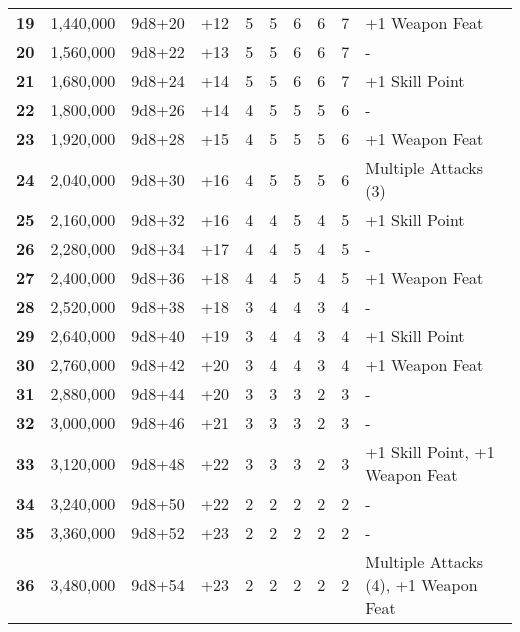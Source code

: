 \begin {table}[H]
\begin{tabularx}{\columnwidth}{>{\bfseries}cccM{.31in}M{.51in}M{.25in}M{.43in}M{.32in}M{.45in}Y}
		19 & 1,440,000 & 9d8+20 & +12 & 5 & 5 & 6 & 6 & 7 & +1 Weapon Feat\\
		20 & 1,560,000 & 9d8+22 & +13 & 5 & 5 & 6 & 6 & 7 & -\\
		21 & 1,680,000 & 9d8+24 & +14 & 5 & 5 & 6 & 6 & 7 & +1 Skill Point\\
		22 & 1,800,000 & 9d8+26 & +14 & 4 & 5 & 5 & 5 & 6 & -\\
		23 & 1,920,000 & 9d8+28 & +15 & 4 & 5 & 5 & 5 & 6 & +1 Weapon Feat\\
		24 & 2,040,000 & 9d8+30 & +16 & 4 & 5 & 5 & 5 & 6 & Multiple Attacks (3)\\
		25 & 2,160,000 & 9d8+32 & +16 & 4 & 4 & 5 & 4 & 5 & +1 Skill Point\\
		26 & 2,280,000 & 9d8+34 & +17 & 4 & 4 & 5 & 4 & 5 & -\\
		27 & 2,400,000 & 9d8+36 & +18 & 4 & 4 & 5 & 4 & 5 & +1 Weapon Feat\\
		28 & 2,520,000 & 9d8+38 & +18 & 3 & 4 & 4 & 3 & 4 & -\\
		29 & 2,640,000 & 9d8+40 & +19 & 3 & 4 & 4 & 3 & 4 & +1 Skill Point\\
		30 & 2,760,000 & 9d8+42 & +20 & 3 & 4 & 4 & 3 & 4 & +1 Weapon Feat\\
		31 & 2,880,000 & 9d8+44 & +20 & 3 & 3 & 3 & 2 & 3 & -\\
		32 & 3,000,000 & 9d8+46 & +21 & 3 & 3 & 3 & 2 & 3 & -\\
		33 & 3,120,000 & 9d8+48 & +22 & 3 & 3 & 3 & 2 & 3 & +1 Skill Point, +1 Weapon Feat\\
		34 & 3,240,000 & 9d8+50 & +22 & 2 & 2 & 2 & 2 & 2 & -\\
		35 & 3,360,000 & 9d8+52 & +23 & 2 & 2 & 2 & 2 & 2 & -\\
		36 & 3,480,000 & 9d8+54 & +23 & 2 & 2 & 2 & 2 & 2 & Multiple Attacks (4), +1 Weapon Feat\
  \end {tabularx}
\end {table}
